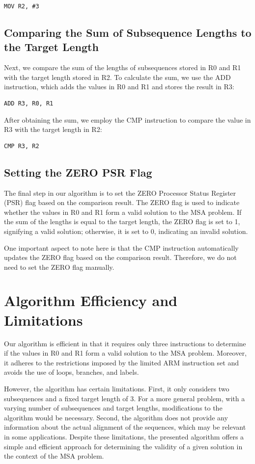 \begin{verbatim}
MOV R2, #3
\end{verbatim}

\subsection{Comparing the Sum of Subsequence Lengths to the Target Length}
Next, we compare the sum of the lengths of subsequences stored in R0 and R1 with the target length stored in R2. To calculate the sum, we use the ADD instruction, which adds the values in R0 and R1 and stores the result in R3:

\begin{verbatim}
ADD R3, R0, R1
\end{verbatim}

After obtaining the sum, we employ the CMP instruction to compare the value in R3 with the target length in R2:

\begin{verbatim}
CMP R3, R2
\end{verbatim}

\subsection{Setting the ZERO PSR Flag}
The final step in our algorithm is to set the ZERO Processor Status Register (PSR) flag based on the comparison result. The ZERO flag is used to indicate whether the values in R0 and R1 form a valid solution to the MSA problem. If the sum of the lengths is equal to the target length, the ZERO flag is set to 1, signifying a valid solution; otherwise, it is set to 0, indicating an invalid solution.

One important aspect to note here is that the CMP instruction automatically updates the ZERO flag based on the comparison result. Therefore, we do not need to set the ZERO flag manually.

\section{Algorithm Efficiency and Limitations}
Our algorithm is efficient in that it requires only three instructions to determine if the values in R0 and R1 form a valid solution to the MSA problem. Moreover, it adheres to the restrictions imposed by the limited ARM instruction set and avoids the use of loops, branches, and labels.

However, the algorithm has certain limitations. First, it only considers two subsequences and a fixed target length of 3. For a more general problem, with a varying number of subsequences and target lengths, modifications to the algorithm would be necessary. Second, the algorithm does not provide any information about the actual alignment of the sequences, which may be relevant in some applications. Despite these limitations, the presented algorithm offers a simple and efficient approach for determining the validity of a given solution in the context of the MSA problem.



